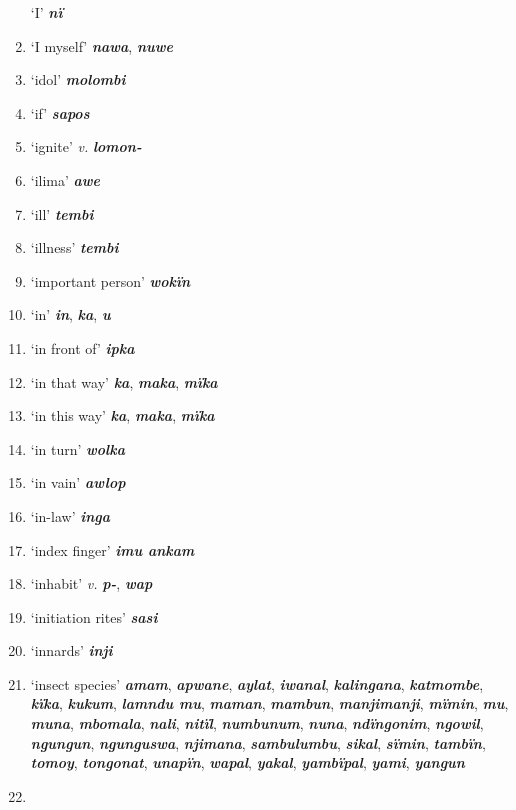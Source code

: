 \begin{enumerate}[noitemsep, label={}, align=left, widest=190, labelsep=1ex,leftmargin=*,itemindent=-10pt]
‘I’ \textbf{\textit{nï}} \item
‘I myself’ \textbf{\textit{nawa}}, \textbf{\textit{nuwe}} \item
‘idol’ \textbf{\textit{molombi}} \item
‘if’ \textbf{\textit{sapos}} \item
‘ignite’ \textit{v.} \textbf{\textit{lomon-}} \item
‘ilima’ \textbf{\textit{awe}} \item
‘ill’ \textbf{\textit{tembi}} \item
‘illness’ \textbf{\textit{tembi}} \item
‘important person’ \textbf{\textit{wokïn}} \item
‘in’ \textbf{\textit{in}}, \textbf{\textit{ka}}, \textbf{\textit{u}} \item
‘in front of’ \textbf{\textit{ipka}} \item
‘in that way’ \textbf{\textit{ka}}, \textbf{\textit{maka}}, \textbf{\textit{mïka}} \item
‘in this way’ \textbf{\textit{ka}}, \textbf{\textit{maka}}, \textbf{\textit{mïka}} \item
‘in turn’ \textbf{\textit{wolka}} \item
‘in vain’ \textbf{\textit{awlop}} \item
‘in-law’ \textbf{\textit{inga}} \item
‘index finger’ \textbf{\textit{imu ankam}} \item
‘inhabit’ \textit{v.} \textbf{\textit{p-}}, \textbf{\textit{wap}} \item
‘initiation rites’ \textbf{\textit{sasi}} \item
‘innards’ \textbf{\textit{inji}} \item
‘insect species’ \textbf{\textit{amam}}, \textbf{\textit{apwane}}, \textbf{\textit{aylat}}, \textbf{\textit{iwanal}}, \textbf{\textit{kalingana}}, \textbf{\textit{katmombe}}, \textbf{\textit{kïka}}, \textbf{\textit{kukum}}, \textbf{\textit{lamndu mu}}, \textbf{\textit{maman}}, \textbf{\textit{mambun}}, \textbf{\textit{manjimanji}}, \textbf{\textit{mïmin}}, \textbf{\textit{mu}}, \textbf{\textit{muna}}, \textbf{\textit{mbomala}}, \textbf{\textit{nali}}, \textbf{\textit{nitïl}}, \textbf{\textit{numbunum}}, \textbf{\textit{nuna}}, \textbf{\textit{ndïngonim}}, \textbf{\textit{ngowil}}, \textbf{\textit{ngungun}}, \textbf{\textit{ngunguswa}}, \textbf{\textit{njimana}}, \textbf{\textit{sambulumbu}}, \textbf{\textit{sikal}}, \textbf{\textit{sïmin}}, \textbf{\textit{tambïn}}, \textbf{\textit{tomoy}}, \linebreak \textbf{\textit{tongonat}}, \textbf{\textit{unapïn}}, \textbf{\textit{wapal}}, \textbf{\textit{yakal}}, \textbf{\textit{yambïpal}}, \textbf{\textit{yami}}, \textbf{\textit{yangun}} \item

\end{enumerate}
